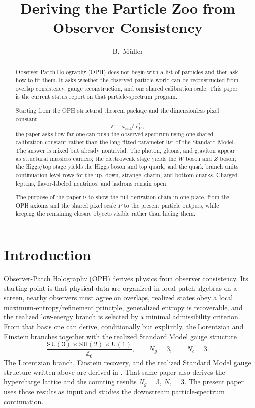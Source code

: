 \documentclass[11pt]{article}
\title{Deriving the Particle Zoo from\\
Observer Consistency}
\author{B.\ M\"uller}
\date{\OPHPaperReleaseDate}
\newcommand{\SU}{\mathrm{SU}}
\newcommand{\U}{\mathrm{U}}
\begin{document}
\maketitle
\OPHPaperReleaseBanner

\begin{abstract}
Observer-Patch Holography (OPH) does not begin with a list of particles and then ask how to fit
them. It asks whether the observed particle world can be reconstructed from overlap consistency,
gauge reconstruction, and one shared calibration scale. This paper is the current status report on
that particle-spectrum program.

Starting from the OPH structural theorem package and the dimensionless pixel constant
\[
P \equiv a_{\mathrm{cell}}/\ell_P^2,
\]
the paper asks how far one can push the observed spectrum using one shared calibration constant
rather than the long fitted parameter list of the Standard Model. The answer is mixed but already
nontrivial. The photon, gluons, and graviton appear as structural massless carriers; the
electroweak stage yields the \(W\) boson and \(Z\) boson; the Higgs/top stage yields the Higgs
boson and top quark; and the quark branch emits continuation-level rows for the up, down,
strange, charm, and bottom quarks. Charged leptons, flavor-labeled neutrinos, and hadrons remain
open.

The purpose of the paper is to show the full derivation chain in one place, from the OPH axioms
and the shared pixel scale \(P\) to the present particle outputs, while keeping the remaining
closure objects visible rather than hiding them.
\end{abstract}

\section{Introduction}

Observer-Patch Holography (OPH) derives physics from observer consistency. Its
starting point is that physical data are organized in local patch algebras on a screen, nearby
observers must agree on overlaps, realized states obey a local maximum-entropy/refinement
principle, generalized entropy is recoverable, and the realized low-energy branch is selected by a
minimal admissibility criterion. From that basis one can derive, conditionally but explicitly, the
Lorentzian and Einstein branches together with the realized Standard Model gauge structure
\[
\frac{\SU(3)\times\SU(2)\times\U(1)}{\mathbb Z_6},
\qquad
N_g=3,
\qquad
N_c=3.
\]
The Lorentzian branch, Einstein recovery, and the realized Standard Model gauge structure written
above are derived in \cite{ophcompact}. That same paper also derives the hypercharge lattice and
the counting results \(N_g=3\), \(N_c=3\). The present paper uses those results as input and
studies the downstream particle-spectrum continuation.
\end{document}

